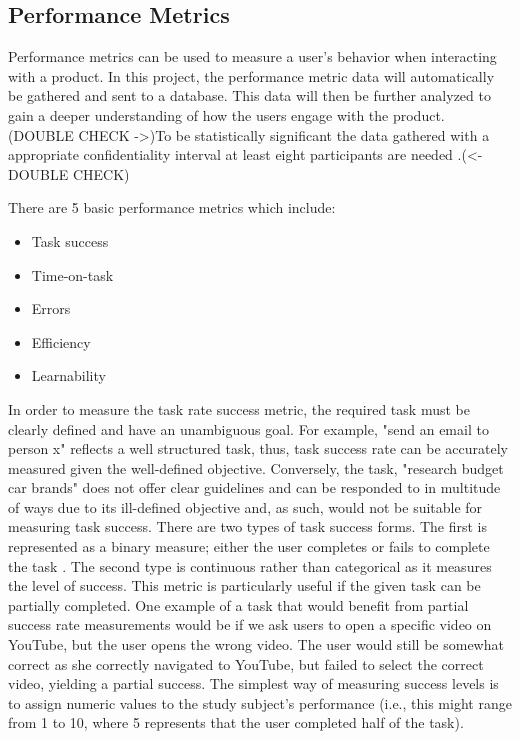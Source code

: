 \subsection{Performance Metrics}
Performance metrics can be used to measure a user's behavior when interacting with a product. In this project, the performance metric data will automatically be gathered and sent to a database. This data will then be further analyzed to gain a deeper understanding of how the users engage with the product. (DOUBLE CHECK ->)To be statistically significant the data gathered with a appropriate confidentiality interval at least eight participants are needed \cite{tullis_albert_2011}.(<- DOUBLE CHECK)

 There are 5 basic performance metrics which include: \cite{tullis_albert_2011} \begin{itemize}
\item Task success
\item Time-on-task
\item Errors
\item Efficiency
\item Learnability
\end{itemize}
In order to measure the task rate success metric, the required task must be clearly defined and have an unambiguous goal. For example, "send an email to person x" reflects a well structured task, thus, task success rate can be accurately measured given the well-defined objective. Conversely, the task, "research budget car brands" does not offer clear guidelines and can be responded to in multitude of ways due to its ill-defined objective and, as such, would not be suitable for measuring task success. There are two types of task success forms. The first is represented as a binary measure; either the user completes or fails to complete the task \cite{tullis_albert_2011}. The second type is continuous rather than categorical as it measures the level of success. This metric is particularly useful if the given task can be partially completed. One example of a task that would benefit from partial success rate measurements would be if we ask users to open a specific video on YouTube, but the user opens the wrong video. The user would still be somewhat correct as she correctly navigated to YouTube, but failed to select the correct video, yielding a partial success. The simplest way of measuring success levels is to assign numeric values to the study subject's performance (i.e., this might range from 1 to 10, where 5 represents that the user completed half of the task).


